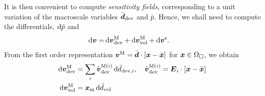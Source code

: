 \documentclass[10pt,a4paper]{article}
\begin{document}
It is then convenient to compute \emph{sensitivity fields}, corresponding to a unit variation of the macroscale variables $\bar{\ts d}_\dev$ and $\bar{p}$. Hence, we shall need to compute the differentials, $\dif\bar p$ and
\begin{align}
    \dif\ta{v}
     = &
    \dif\ta{v}^\macro_\dev + \dif\ta{v}^\macro_\vol + \dif\ta{v}^\fluct.
\end{align}
From the first order representation $\ta{v}^\macro = \bar{\ts d}\cdot[\ta{x}-\bar{\ta{x}}]$ for $\ta{x}\in\Omega_\Box$, we obtain %
\begin{align}
  \dif \ta{v}^{\macro}_\dev &= \sum_{i} \hat{\ta{v}}^{\macro(i)}_\dev \dif\bar{d}_{\dev,i}, \quad  \hat{\ta{v}}^{\macro(i)}_\dev = \ts E_i \cdot [\ta x - \bar{\ta x}]
    \label{eq216}\\
\dif\ta{v}^\macro_\vol &= \ta x_\mean \dif \bar{d}_\vol
\end{align}
\end{document}
